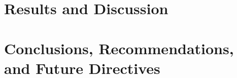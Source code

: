 
\ifResultDiscuss 
	\chapter{Results and Discussion} 
	\label{ch:result_discuss} 
	\startcontents[chapters]
	\begin{SingleSpace}	
		\Mprintcontents 
	\end{SingleSpace}
	
	\stopcontents[chapters]
	\cleardoublepage
\fi

\ifConc
	\chapter{Conclusions, Recommendations, and Future Directives} 
	\label{ch:conc} 
	\startcontents[chapters]
	\begin{SingleSpace}	
		\Mprintcontents 
	\end{SingleSpace}
	
	\stopcontents[chapters]
	\cleardoublepage
\fi

